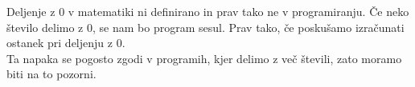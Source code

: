 \documentclass{article}
\begin{document}
\begin{errors}
Deljenje z 0 v matematiki ni definirano in prav tako ne v programiranju. Če neko število delimo z 0, se nam bo program sesul. Prav tako, če poskušamo izračunati ostanek pri deljenju z 0. \\
Ta napaka se pogosto zgodi v programih, kjer delimo z več števili, zato moramo biti na to pozorni.
\end{errors}
\end{document}
